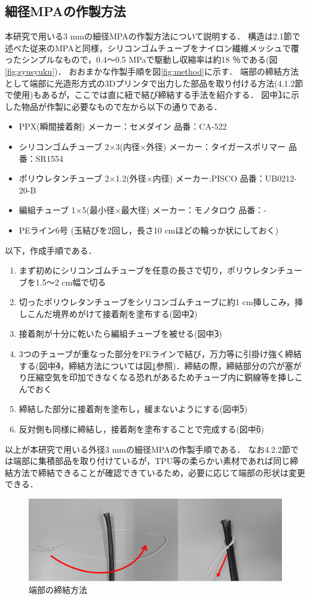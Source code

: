 \subsection{細径MPAの作製方法}
本研究で用いる3 mmの細径MPAの作製方法について説明する．
構造は2.1節で述べた従来のMPAと同様，シリコンゴムチューブをナイロン繊維メッシュで覆ったシンプルなもので，0.4～0.5 MPaで駆動し収縮率は約18 ％である(図\ref{fig:syusyuku})．
おおまかな作製手順を図\ref{fig:method}に示す．
端部の締結方法として端部に光造形方式の3Dプリンタで出力した部品を取り付ける方法(4.1.2節で使用)もあるが，ここでは直に紐で結び締結する手法を紹介する．
図中\textcircled{\scriptsize 1}に示した物品が作製に必要なもので左から以下の通りである．
%
\begin{itemize}
  \item PPX(瞬間接着剤) メーカー：セメダイン 品番：CA-522
  \item シリコンゴムチューブ 2×3(内径×外径) メーカー：タイガースポリマー 品番：SR1554
  \item ポリウレタンチューブ 2×1.2(外径×内径) メーカー:PISCO 品番：UB0212-20-B
  \item 編組チューブ 1×5(最小径×最大径) メーカー：モノタロウ 品番：-
  \item PEライン6号 (玉結びを2回し，長さ10 cmほどの輪っか状にしておく)
\end{itemize}
%
以下，作成手順である．
%
\begin{enumerate}
  \item まず初めにシリコンゴムチューブを任意の長さで切り，ポリウレタンチューブを1.5～2 cm幅で切る
  \item 切ったポリウレタンチューブをシリコンゴムチューブに約1 cm挿しこみ，挿しこんだ境界めがけて接着剤を塗布する(図中\textcircled{\scriptsize 2})
  \item 接着剤が十分に乾いたら編組チューブを被せる(図中\textcircled{\scriptsize 3})
  \item 3つのチューブが重なった部分をPEラインで結び，万力等に引掛け強く締結する(図中\textcircled{\scriptsize 4}，締結方法については図\ref{fig:teiketu}参照)．締結の際，締結部分の穴が塞がり圧縮空気を印加できなくなる恐れがあるためチューブ内に銅線等を挿しこんでおく
  \item 締結した部分に接着剤を塗布し，緩まないようにする(図中\textcircled{\scriptsize 5})
  \item 反対側も同様に締結し，接着剤を塗布することで完成する(図中\textcircled{\scriptsize 6})
\end{enumerate}
%
以上が本研究で用いる外径3 mmの細径MPAの作製手順である．
なお4.2.2節では端部に集積部品を取り付けているが，TPU等の柔らかい素材であれば同じ締結方法で締結できることが確認できているため，必要に応じて端部の形状は変更できる．
\begin{figure}[t]
  \centering
  \includegraphics[scale=0.7]{image/teiketu.png}
  \caption{端部の締結方法}
  \label{fig:teiketu}
\end{figure}



